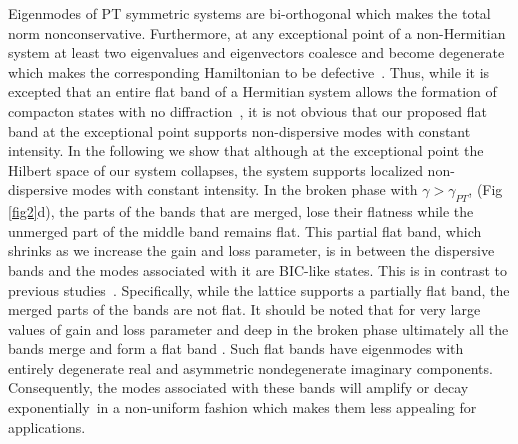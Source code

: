 \documentclass[aps,prl,twocolumn,showpacs,groupedaddress,amsmath,amssymb]{revtex4}
\begin{document}
Eigenmodes of PT symmetric systems are bi-orthogonal which makes the total norm nonconservative. Furthermore, at any exceptional point of a non-Hermitian system at least two eigenvalues and eigenvectors coalesce and become degenerate \cite{24,30,t5} which makes the corresponding Hamiltonian to be defective \cite{32}. Thus, while it is excepted that an entire flat band of a Hermitian system allows the formation of compacton states with no diffraction \cite{31}, it is not obvious that our proposed flat band at the exceptional point supports non-dispersive modes with constant intensity. In the following we show that although at the exceptional point the Hilbert space of our system collapses, the system supports localized non-dispersive modes with constant intensity. In the broken phase with $\gamma>\gamma_{PT}$, (Fig \ref{fig2}d), the parts of the bands that are merged, lose their flatness while the unmerged part of the middle band remains flat. This partial flat band, which shrinks as we increase the gain and loss parameter, is in between the dispersive bands and the modes associated with it are BIC-like states. This is in contrast to previous studies \cite{24, 25,26}. Specifically, while the lattice supports a partially flat band, the merged parts of the bands are not flat. It should be noted that for very large values of gain and loss parameter and deep in the broken phase ultimately all the bands merge and form a flat band \cite{24, 25,26}. Such flat bands have eigenmodes with entirely degenerate real and asymmetric nondegenerate imaginary components. Consequently, the modes associated with these bands will amplify or decay exponentially in a non-uniform fashion \cite{27} which makes them less appealing for applications.
\end{document}
